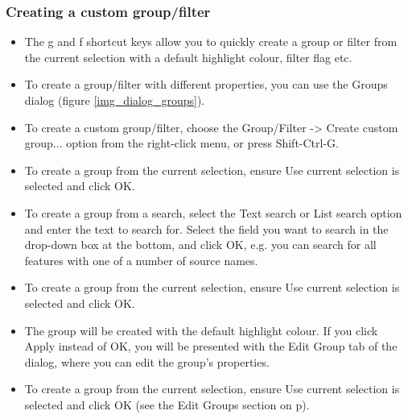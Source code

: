 \documentclass[letterpaper]{article}
\newcommand\liststyleWWviiiNumxvi{%
\renewcommand\labelitemi{{\textbullet}}
\renewcommand\labelitemii{o}
\renewcommand\labelitemiii{[F0A7?]}
\renewcommand\labelitemiv{[F0B7?]}
}
\begin{document}
{\color[rgb]{0.30980393,0.5058824,0.7411765}\subsubsection[Creating a group from a selection]{Creating a custom group/filter}}
\hypertarget{RefHeading2061056909880}{}\liststyleWWviiiNumxvi
\begin{itemize}
\item {The {\textquotesingle}g {\textquotesingle} and {\textquotesingle}f {\textquotesingle} shortcut keys allow you to quickly create a group or filter from the current selection with a default highlight colour, filter flag etc.}
\item {To create a group/filter with different properties, you can use the Groups dialog (figure \ref{img_dialog_groups}).}
\item {To create a custom group/filter, choose the {\textquotesingle}Group/Filter -> Create custom group... {\textquotesingle} option from the right-click menu, or press {\textquotesingle}Shift-Ctrl-G{\textquotesingle}.}
\item {To create a group from the current selection, ensure {\textquotesingle}Use current selection{\textquotesingle} is selected and click OK.}
\item {To create a group from a search, select the {\textquotesingle}Text search{\textquotesingle} or {\textquotesingle}List search{\textquotesingle} option and enter the text to search for. Select the field you want to search in the drop-down box at the bottom, and click OK, e.g. you can search for all features with one of a number of source names.}
\item {To create a group from the current selection, ensure {\textquotesingle}Use current selection{\textquotesingle} is selected and click OK.}
\item {The group will be created with the default highlight colour. If you click Apply instead of OK, you will be presented with the Edit Group tab of the dialog, where you can edit the group's properties.}
\item {To create a group from the current selection, ensure {\textquotesingle}Use current selection{\textquotesingle} is selected and click OK (see the Edit Groups section on p\pageref{section:edit_group}).}
\end{itemize}
\end{document}
